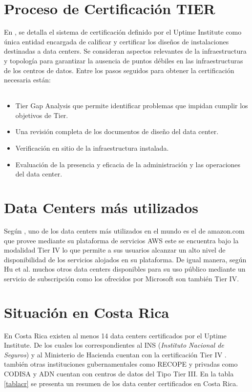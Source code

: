 \documentclass[journal]{IEEEtran}
\begin{document}
\section{Proceso de Certificación TIER}
En \cite{george}, se detalla el sistema de certificación definido por el Uptime Institute como única entidad encargada de calificar y certificar los diseños de instalaciones destinadas a data centers. 
Se consideran aspectos relevantes de la infraestructura y topología para garantizar la ausencia de puntos débiles en las infraestructuras de los centros de datos.
Entre los pasos seguidos para obtener la certificación necesaria están:
\\
\\
\begin{itemize}
  \item Tier Gap Analysis que permite identificar problemas que impidan cumplir los objetivos de Tier.
  \item Una revisión completa de los documentos de diseño del data center.
  \item Verificación en sitio de la infraestructura instalada.
  \item Evaluación de la presencia y eficacia de la administración y las operaciones del data center.
\end{itemize}
\section{Data Centers más utilizados}
Según \cite{amazon_2003}, uno de los data centers más utilizados en el mundo es el de amazon.com que provee mediante su plataforma de servicios AWS este se encuentra bajo la modalidad Tier IV
lo que permite a sus usuarios alcanzar un alto nivel de disponibilidad de los servicios alojados en su plataforma.
De igual manera, según Hu et al.\cite{zhengbing_gnatyuk_koval_gnatyuk_bondarovets_2017} muchos otros data centers disponibles para su uso público mediante un servicio de subscripción como los ofrecidos por Microsoft son también Tier IV.
\section{Situación en Costa Rica}
En Costa Rica existen al menos 14 data centers certificados por el Uptime Institute. De los cuales los correspondientes al INS (\emph{Instituto Nacional de Seguros}) y al Ministerio de Hacienda cuentan con la certificación Tier IV \cite{castro}.
también otras instituciones gubernamentales como RECOPE y privadas como CODISA y ADN cuentan con centros de datos del Tipo Tier III. En la tabla \ref{tablacr} se presenta un resumen de los data center certificados en Costa Rica.
\end{document}
